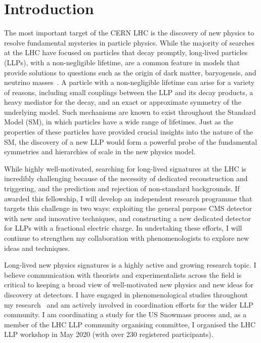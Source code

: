 \documentclass[11pt,a4paper]{article}
\theoremstyle{plain} \numberwithin{equation}{section}
\theoremstyle{definition}
\newcounter{list}
\begin{document}
\section*{Introduction}

\nocite{ball2020search,2019134876,CMS:2016dbr,CMS:2015dbr,simplifiedLikelihood,Buckley_2019,Zabi:2016ljo,Kreis:2015jjr,Bagnaschi:2016afc,Bagnaschi:2015eha,Buchmueller:2014yva,Buchmueller:2012hv,deVries:2015hva,Buchmueller:2015uqa,Citron:2012fg,Alimena_2020}
The most important target of the CERN LHC is the discovery of new physics to
resolve fundamental mysteries in particle physics.
While the majority of searches at the LHC have focused on particles that 
decay promptly, long-lived particles (LLPs), with a non-negligible lifetime,
are a common feature in models that provide solutions to 
questions such as the origin of dark matter, baryogensis, and 
neutrino masses~\cite{Alimena_2020}. A particle with a 
non-negligible lifetime can arise for a variety of reasons, including small 
couplings between the LLP and its decay products, a heavy mediator for the decay, 
and an exact or approximate symmetry of the underlying model. 
Such mechanisms are known to exist 
throughout the Standard Model (SM), in which particles have
a wide range of lifetimes. Just as the properties of these particles 
have provided crucial insights into the nature of the SM, the discovery of a new LLP 
would form a powerful probe of the fundamental symmetries and hierarchies of scale in
the new physics model. 

While highly well-motivated, searching for long-lived signatures at the LHC is 
incredibly challenging because of the necessity of dedicated reconstruction 
and triggering, and the prediction and rejection of non-standard backgrounds. 
If awarded this fellowship, I will develop an independent research programme
that targets this challenge in two ways: exploiting
the general purpose CMS detector with new and innovative techniques,
and constructing a new dedicated detector for LLPs
with a fractional electric charge. In undertaking these efforts,
I will continue to strengthen my collaboration
with phenomenologists to explore new ideas and techniques.

Long-lived new physics signatures is a highly active and
growing research topic. I believe communication with theorists and experimentalists
across the field is critical to keeping a broad view of well-motivated
new physics and new ideas for discovery at detectors. I have engaged
in phenomenological studies throughout my research~\cite{deVries:2015hva,Citron:2012fg} 
and am actively involved in coordination efforts for the wider LLP community.
I am coordinating a study for the US Snowmass process and, 
as a member of the LHC LLP community organising committee, I
organised the LHC LLP workshop in May 2020 (with over 230 registered participants).
\end{document}
